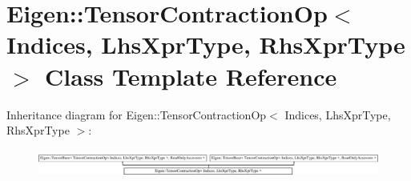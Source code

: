 \hypertarget{class_eigen_1_1_tensor_contraction_op}{}\section{Eigen\+:\+:Tensor\+Contraction\+Op$<$ Indices, Lhs\+Xpr\+Type, Rhs\+Xpr\+Type $>$ Class Template Reference}
\label{class_eigen_1_1_tensor_contraction_op}
Inheritance diagram for Eigen\+:\+:Tensor\+Contraction\+Op$<$ Indices, Lhs\+Xpr\+Type, Rhs\+Xpr\+Type $>$\+:\begin{figure}[H]
\begin{center}
\leavevmode
\includegraphics[height=0.909091cm]{class_eigen_1_1_tensor_contraction_op}
\end{center}
\end{figure}
